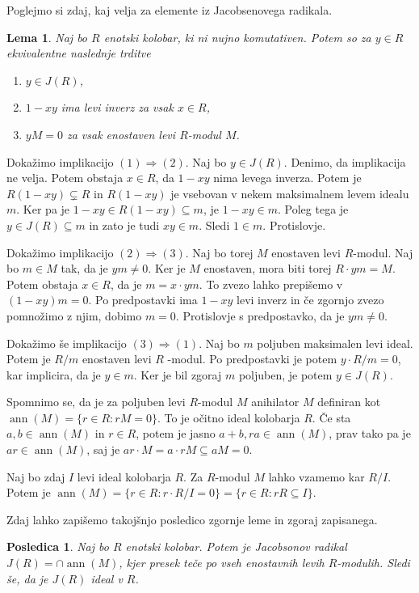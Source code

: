 \documentclass[a4paper, 12pt]{amsart}
\theoremstyle{definition} %
\theoremstyle{plain} %
\newtheorem{lema}[definicija]{Lema}
\newtheorem{posledica}[definicija]{Posledica}
\DeclareMathOperator{\ann}{ann}
\begin{document}
Poglejmo si zdaj, kaj velja za elemente iz Jacobsenovega radikala.
\begin{lema}
\label{J(R)-prvic}
Naj bo $R$ enotski kolobar, ki ni nujno komutativen. Potem so za $y\in R$ ekvivalentne naslednje trditve
 \begin{enumerate}
 \item $y\in J(R)$,
\item $1-xy$ ima levi inverz za vsak $x\in R$,
\item $ yM = 0$ za vsak enostaven levi $R$-modul $M$.
\end{enumerate}
\end{lema}

\proof
Dokažimo implikacijo $(1) \Rightarrow (2)$. Naj bo $y\in J(R)$. Denimo, da implikacija ne velja. Potem obstaja $x\in R$, da $1-xy$ nima levega inverza. Potem je $R(1-xy) \subsetneq R$ in $R(1-xy)$ je vsebovan v nekem maksimalnem levem idealu $m$. Ker pa je $1-xy \in R(1-xy) \subseteq m$, je $1-xy\in m$. Poleg tega je $y\in J(R) \subseteq m$ in zato je tudi $xy \in m$. Sledi $1\in m$. Protislovje.

Dokažimo implikacijo $(2) \Rightarrow (3)$. Naj bo torej $M$ enostaven levi $R$-modul. Naj bo $m\in M$ tak, da je $ym \neq 0$. Ker je $M$ enostaven, mora biti torej $R\cdot ym = M$. Potem obstaja $x\in R$, da je $m = x\cdot ym$. To zvezo lahko prepišemo v $(1-xy)m=0$. Po predpostavki ima $1-xy$ levi inverz in če zgornjo zvezo pomnožimo z njim, dobimo $m=0$. Protislovje s predpostavko, da je $ym\neq 0$.

Dokažimo še implikacijo $(3) \Rightarrow (1)$. Naj bo $m$ poljuben maksimalen levi ideal. Potem je $R/m$ enostaven levi $R$ -modul. Po predpostavki je potem $y  \cdot R/m = 0$, kar implicira, da je $y\in m$. Ker je bil zgoraj $m$ poljuben, je potem $y\in J(R)$.
\endproof

Spomnimo se, da je za poljuben levi $R$-modul $M$ anihilator $M$ definiran kot $\ann(M) = \{r\in R: rM = 0\}$. To je očitno ideal kolobarja $R$. Če sta $a,b\in \ann(M)$ in $r\in R$, potem je jasno $a+b, ra\in \ann(M)$, prav tako pa je $ar\in \ann(M)$, saj je $ar\cdot M = a \cdot rM \subseteq a M =0$.

Naj bo zdaj $I$ levi ideal kolobarja $R$. Za $R$-modul $M$ lahko vzamemo kar $R/I$. Potem je $\ann(M) = \{r\in R: r\cdot R/I = 0\} = \{ r\in R: rR \subseteq I\}$.

Zdaj lahko zapišemo takojšnjo posledico zgornje leme in zgoraj zapisanega. 
\begin{posledica}
\label{J(R)-presekAnihilatorjev}
Naj bo $R$ enotski kolobar. Potem je Jacobsonov radikal $J(R) = \cap \ann(M)$, kjer presek teče po vseh enostavnih levih $R$-modulih. Sledi še, da je $J(R)$ ideal v $R$.
\end{posledica}
\end{document}
